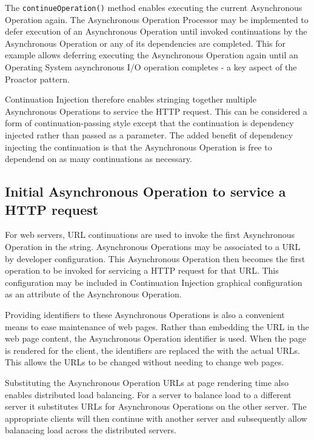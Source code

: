 \documentclass{article}
\begin{document}
The \texttt{continueOperation()} method enables executing the current
Asynchronous Operation again.  The Asynchronous Operation Processor may be
implemented to defer execution of an Asynchronous Operation until invoked
continuations by the Asynchronous Operation or any of its dependencies are
completed.  This for example allows deferring executing the Asynchronous
Operation again until an Operating System asynchronous I/O operation completes -
a key aspect of the Proactor pattern.

Continuation Injection therefore enables stringing together multiple
Asynchronous Operations to service the HTTP request.  This can be considered a
form of continuation-passing style \cite{continuations} except that the
continuation is dependency injected rather than passed as a parameter.  The
added benefit of dependency injecting the continuation is that the Asynchronous
Operation is free to dependend on as many continuations as necessary.


\subsection{Initial Asynchronous Operation to service a HTTP request}

For web servers, URL continuations \cite{url-continuation} are used to invoke
the first Asynchronous Operation in the string.  Asynchronous Operations may be
associated to a URL by developer configuration.  This Asynchronous Operation
then becomes the first operation to be invoked for servicing a HTTP request for
that URL.  This configuration may be included in Continuation Injection graphical
configuration as an attribute of the Asynchronous Operation.

Providing identifiers to these Asynchronous Operations is also a convenient
means to ease maintenance of web pages.  Rather than embedding the URL in the
web page content, the Asynchronous Operation identifier is used.  When the page
is rendered for the client, the identifiers are replaced the with the actual
URLs.  This allows the URLs to be changed without needing to change web pages. 

Substituting the Asynchronous Operation URLs at page rendering time also enables
distributed load balancing.  For a server to balance load to a different server
it substitutes URLs for Asynchronous Operations on the other server. The
appropriate clients will then continue with another server and subsequently
allow balanacing load across the distributed servers.
\end{document}
